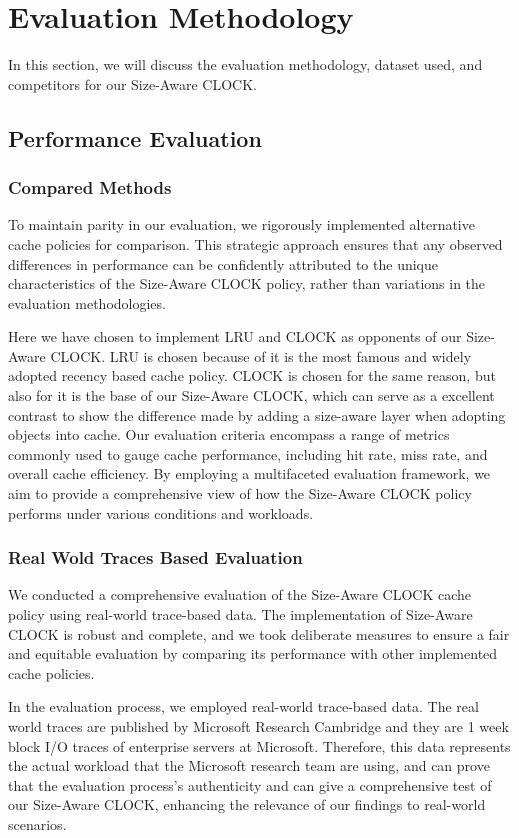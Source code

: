 \documentclass[conference]{IEEEtran}
\begin{document}
\section{Evaluation Methodology}
In this section, we will discuss the evaluation methodology, dataset used, and competitors for our Size-Aware CLOCK.

\subsection{Performance Evaluation}
\subsubsection{Compared Methods}
To maintain parity in our evaluation, we rigorously implemented alternative cache policies for comparison. This strategic approach ensures that any observed differences in performance can be confidently attributed to the unique characteristics of the Size-Aware CLOCK policy, rather than variations in the evaluation methodologies.

Here we have chosen to implement LRU and CLOCK as opponents of our Size-Aware CLOCK. LRU is chosen because of it is the most famous and widely adopted recency based cache policy. CLOCK is chosen for the same reason, but also for it is the base of our Size-Aware CLOCK, which can serve as a excellent contrast to show the difference made by adding a size-aware layer when adopting objects into cache. Our evaluation criteria encompass a range of metrics commonly used to gauge cache performance, including hit rate, miss rate, and overall cache efficiency. By employing a multifaceted evaluation framework, we aim to provide a comprehensive view of how the Size-Aware CLOCK policy performs under various conditions and workloads.

\subsubsection{Real Wold Traces Based Evaluation}
We conducted a comprehensive evaluation of the Size-Aware CLOCK cache policy using real-world trace-based data. The implementation of Size-Aware CLOCK is robust and complete, and we took deliberate measures to ensure a fair and equitable evaluation by comparing its performance with other implemented cache policies.

In the evaluation process, we employed real-world trace-based data. The real world traces are published by Microsoft Research Cambridge and they are 1 week block I/O traces of enterprise servers at Microsoft. Therefore, this data represents the actual workload that the Microsoft research team are using, and can prove that the evaluation process's authenticity and can give a comprehensive test of our Size-Aware CLOCK, enhancing the relevance of our findings to real-world scenarios.
\end{document}
